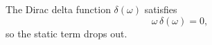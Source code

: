 \documentclass{article}
\begin{document}
The Dirac delta function $\delta(\omega)$ satisfies
\begin{equation}
\omega\,\delta(\omega) = 0 ,
\label{eq:delta}
\end{equation}
so the static term drops out.
\end{document}
